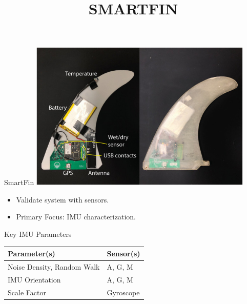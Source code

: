 \documentclass{beamer}
\title{SMARTFIN}
\begin{document}
\begin{frame}{SmartFin}
        \centering 
    \includegraphics[width=0.8\textwidth, height=0.6\textheight, keepaspectratio]{images/labelled-smartfin.jpg}
    \vspace{0.5em} 
    \begin{itemize}
        \item Validate system with sensors.
        \item Primary Focus: IMU characterization.
    \end{itemize}
\end{frame}

\begin{frame}{Key IMU Parameters}
    \centering
    \begin{tabular}{|l|l|}
        \hline
        \textbf{Parameter(s)} & \textbf{Sensor(s)} \\
        \hline
        Noise Density, Random Walk & A, G, M \\
        \hline
        IMU Orientation & A, G, M  \\
        \hline
        Scale Factor & Gyroscope \\
        \hline
    \end{tabular}
\end{frame}
\end{document}
